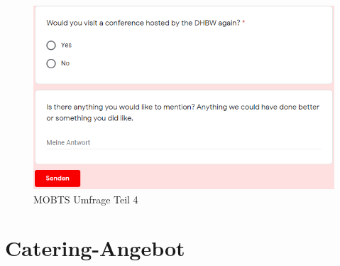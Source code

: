 \begin{figure}[h]
	\centering
	\includegraphics[width=10 cm]{img/survey4.png}
	\caption[MOBTS Umfrage]{MOBTS Umfrage Teil 4}
	\label{fig:survey4}
\end{figure}

\chapter{Catering-Angebot}
\label{app:angebot}

%

